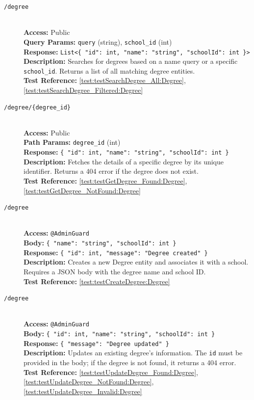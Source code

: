 \begin{description}
	\item[\GET \quad \texttt{/degree}] \hfill \\
	\textbf{Access:} Public \\
	\textbf{Query Params:} \texttt{query} (string), \texttt{school\_id} (int) \\
	\textbf{Response:} \texttt{List<\{ "id": int, "name": "string", "schoolId": int \}>} \\
	\textbf{Description:} Searches for degrees based on a name query or a specific \texttt{school\_id}. Returns a list of all matching degree entities.\\
	\textbf{Test Reference:} \ref{test:testSearchDegree_All:Degree}, \ref{test:testSearchDegree_Filtered:Degree}
	
	\item[\GET \quad \texttt{/degree/\{degree\_id\}}] \hfill \\
	\textbf{Access:} Public \\
	\textbf{Path Params:} \texttt{degree\_id} (int) \\
	\textbf{Response:} \texttt{\{ "id": int, "name": "string", "schoolId": int \}} \\
	\textbf{Description:} Fetches the details of a specific degree by its unique identifier. Returns a 404 error if the degree does not exist.\\
	\textbf{Test Reference:} \ref{test:testGetDegree_Found:Degree}, \ref{test:testGetDegree_NotFound:Degree}
	
	\item[\POST \quad \texttt{/degree}] \hfill \\
	\textbf{Access:} \texttt{@AdminGuard} \\
	\textbf{Body:} \texttt{\{ "name": "string", "schoolId": int \}} \\
	\textbf{Response:} \texttt{\{ "id": int, "message": "Degree created" \}} \\
	\textbf{Description:} Creates a new Degree entity and associates it with a school. Requires a JSON body with the degree name and school ID.\\
	\textbf{Test Reference:} \ref{test:testCreateDegree:Degree}
	
	\item[\PUT \quad \texttt{/degree}] \hfill \\
	\textbf{Access:} \texttt{@AdminGuard} \\
	\textbf{Body:} \texttt{\{ "id": int, "name": "string", "schoolId": int \}} \\
	\textbf{Response:} \texttt{\{ "message": "Degree updated" \}} \\
	\textbf{Description:} Updates an existing degree's information. The \texttt{id} must be provided in the body; if the degree is not found, it returns a 404 error.\\
	\textbf{Test Reference:} \ref{test:testUpdateDegree_Found:Degree}, \ref{test:testUpdateDegree_NotFound:Degree}, \ref{test:testUpdateDegree_Invalid:Degree}
	

\end{description}
